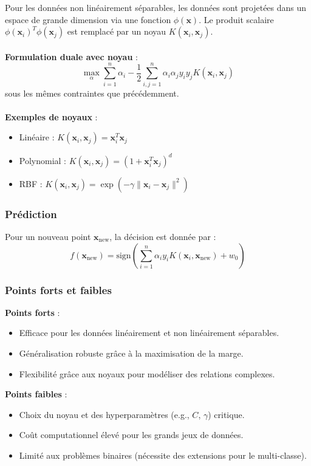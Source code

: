 \documentclass[a4paper,portrait]{article}
\begin{document}
\begin{multicols}{2}
Pour les données non linéairement séparables, les données sont projetées dans un espace de grande dimension via une fonction \( \phi(\mathbf{x}) \). Le produit scalaire \( \phi(\mathbf{x}_i)^T \phi(\mathbf{x}_j) \) est remplacé par un noyau \( K(\mathbf{x}_i, \mathbf{x}_j) \).
\\\\
\textbf{Formulation duale avec noyau} :
\[
\max_{\alpha} \sum_{i=1}^n \alpha_i - \frac{1}{2} \sum_{i,j=1}^n \alpha_i \alpha_j y_i y_j K(\mathbf{x}_i, \mathbf{x}_j)
\]
sous les mêmes contraintes que précédemment.
\\\\
\textbf{Exemples de noyaux} :
\begin{itemize}
    \item Linéaire : \( K(\mathbf{x}_i, \mathbf{x}_j) = \mathbf{x}_i^T \mathbf{x}_j \)
    \item Polynomial : \( K(\mathbf{x}_i, \mathbf{x}_j) = (1 + \mathbf{x}_i^T \mathbf{x}_j)^d \)
    \item RBF : \( K(\mathbf{x}_i, \mathbf{x}_j) = \exp(-\gamma \|\mathbf{x}_i - \mathbf{x}_j\|^2) \)
\end{itemize}

\subsubsection{Prédiction}

Pour un nouveau point \( \mathbf{x}_{\text{new}} \), la décision est donnée par :
\[
f(\mathbf{x}_{\text{new}}) = \text{sign}\left( \sum_{i=1}^n \alpha_i y_i K(\mathbf{x}_i, \mathbf{x}_{\text{new}}) + w_0 \right)
\]


\subsubsection{Points forts et faibles}

\textbf{Points forts} :
\begin{itemize}
    \item Efficace pour les données linéairement et non linéairement séparables.
    \item Généralisation robuste grâce à la maximisation de la marge.
    \item Flexibilité grâce aux noyaux pour modéliser des relations complexes.
\end{itemize}

\textbf{Points faibles} :
\begin{itemize}
    \item Choix du noyau et des hyperparamètres (e.g., \( C \), \( \gamma \)) critique.
    \item Coût computationnel élevé pour les grands jeux de données.
    \item Limité aux problèmes binaires (nécessite des extensions pour le multi-classe).
\end{itemize}


\end{multicols}
\end{document}
